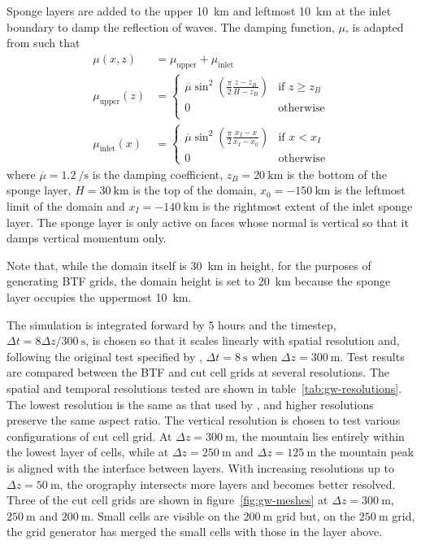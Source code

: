 \documentclass{ametsoc}
\begin{document}
Sponge layers are added to the upper \SI{10}{\kilo\meter} and leftmost \SI{10}{\kilo\meter} at the inlet boundary to damp the reflection of waves.
The damping function, \(\mu\), is adapted from \citet{melvin2010} such that
\begin{align}
	\mu(x, z) &= \mu_\mathrm{upper} + \mu_\mathrm{inlet} \\
	\mu_\mathrm{upper}(z) &= \begin{cases}
		\overline{\mu} \sin^2 \left( \frac{\pi}{2} \frac{z - z_B}{H - z_B} \right) & \text{if } z \geq z_B \\
		0 & \text{otherwise} \\
	\end{cases} \\
	\mu_\mathrm{inlet}(x) &= \begin{cases}
		\overline{\mu} \sin^2 \left( \frac{\pi}{2} \frac{x_I - x}{x_I - x_0} \right) & \text{if } x < x_I \\
		0 & \text{otherwise}
	\end{cases}
\end{align}
where $\overline{\mu} = \SI{1.2}{\per\second}$ is the damping coefficient, $z_B = \SI{20}{\kilo\meter}$ is the bottom of the sponge layer, $H = \SI{30}{\kilo\meter}$ is the top of the domain, $x_0 = \SI{-150}{\kilo\meter}$ is the leftmost limit of the domain and $x_I = \SI{-140}{\kilo\meter}$ is the rightmost extent of the inlet sponge layer.  The sponge layer is only active on faces whose normal is vertical so that it damps vertical momentum only.

Note that, while the domain itself is \SI{30}{\kilo\meter} in height, for the purposes of generating BTF grids, the domain height is set to \SI{20}{\kilo\meter} because the sponge layer occupies the uppermost \SI{10}{\kilo\meter}.

The simulation is integrated forward by 5 hours and the timestep, $\Delta t = 8 \Delta z / \SI{300}{\second}$, is chosen so that it scales linearly with spatial resolution and, following the original test specified by \citet{schaer2002}, $\Delta t = \SI{8}{\second}$ when $\Delta z = \SI{300}{\meter}$.
Test results are compared between the BTF and cut cell grids at several resolutions.
The spatial and temporal resolutions tested are shown in table~\ref{tab:gw-resolutions}.  The lowest resolution is the same as that used by \citet{schaer2002}, and higher resolutions preserve the same aspect ratio.
The vertical resolution is chosen to test various configurations of cut cell grid.  At $\Delta z = \SI{300}{\meter}$, the mountain lies entirely within the lowest layer of cells, while at $\Delta z = \SI{250}{\meter}$ and $\Delta z = \SI{125}{\meter}$ the mountain peak is aligned with the interface between layers.  With increasing resolutions up to $\Delta z = \SI{50}{\meter}$, the orography intersects more layers and becomes better resolved.  Three of the cut cell grids are shown in figure~\ref{fig:gw-meshes} at $\Delta z = \SI{300}{\meter}$, $\SI{250}{\meter}$ and $\SI{200}{\meter}$.  Small cells are visible on the $\SI{200}{\meter}$ grid but, on the $\SI{250}{\meter}$ grid, the grid generator has merged the small cells with those in the layer above.
\end{document}
